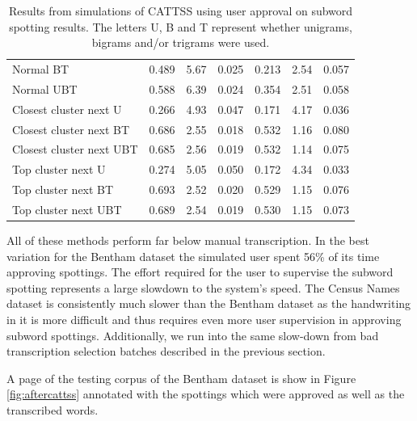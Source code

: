 \documentclass[ms,electronic,twosidetoc,letterpaper,chaptercenter,parttop,lof,lot]{byumsphd}
\begin{document}
\begin{table}
\begin{tabular}{| l | c c c | c c c |}
  Normal BT & 0.489 & 5.67 & 0.025 &  0.213 & 2.54 & 0.057 \\  
  Normal UBT & 0.588 & 6.39 & 0.024 &  0.354 & 2.51 & 0.058 \\
  Closest cluster next U & 0.266 & 4.93 & 0.047 & 0.171 & 4.17 & 0.036 \\
  Closest cluster next BT & 0.686 & 2.55 & 0.018 & 0.532 & 1.16 & 0.080 \\
  Closest cluster next UBT & 0.685 & 2.56 & 0.019 & 0.532 & 1.14 & 0.075 \\
  Top cluster next U & 0.274 & 5.05 & 0.050 & 0.172 & 4.34 & 0.033 \\
  Top cluster next BT & 0.693 & 2.52 & 0.020 & 0.529 & 1.15 & 0.076 \\
  Top cluster next UBT & 0.689 & 2.54 & 0.019 & 0.530 & 1.15 & 0.073 \\
  \hline  
\end{tabular}
\caption{Results from simulations of CATTSS using user approval on subword spotting results. The letters U, B and T represent whether unigrams, bigrams and/or trigrams were used.}
\label{tab:appresults}
\end{table}

All of these methods perform far below manual transcription. In the best variation for the Bentham dataset the simulated user spent 56\% of its time approving spottings. The effort required for the user to supervise the subword spotting represents a large slowdown to the system's speed. The Census Names dataset is consistently much slower than the Bentham dataset as the handwriting in it is more difficult and thus requires even more user supervision in approving subword spottings. Additionally, we run into the same slow-down from bad transcription selection batches described in the previous section.

A page of the testing corpus of the Bentham dataset is show in Figure \ref{fig:aftercattss} annotated with the spottings which were approved as well as the transcribed words. %
\end{document}
